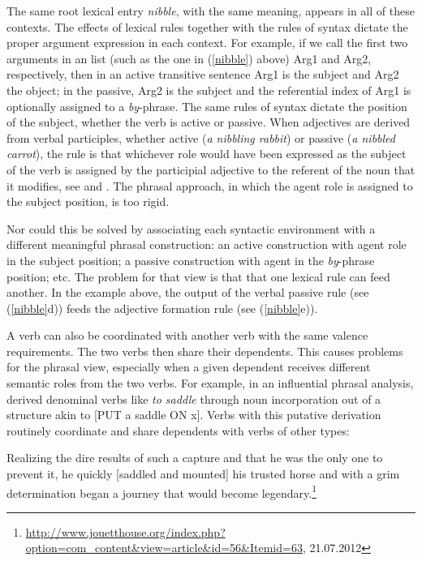 \documentclass[output=paper]{langsci/langscibook}
\begin{document}
The same root lexical entry \emph{nibble}, with the same meaning, appears in all of these contexts.
The effects of lexical rules together with the rules of syntax dictate the proper argument
expression in each context.  For example, if we call the first two arguments in an \argst list
(such as the one in (\ref{nibble}) above) Arg1 and Arg2, respectively, then in an active
transitive sentence Arg1 is the subject and Arg2 the object; in the passive, Arg2 is the subject and
the referential index of Arg1 is optionally assigned to a \emph{by}-phrase.  The same rules of
syntax dictate the position of the subject, whether the verb is active or passive.  When adjectives
are derived from verbal participles, whether active (\emph{a nibbling rabbit}) or passive (\emph{a
  nibbled carrot}), the rule is that whichever role would have been expressed as the subject of the
verb is assigned by the participial adjective to the referent of the noun that it modifies, see \citet{Bresnan:1982passive} 
and \citet[Chapter~3]{BATW2015a}.  
The phrasal approach, in which the agent role is assigned to the subject position, is too rigid.  

Nor could this be solved by associating each syntactic environment with a different meaningful phrasal construction: an active construction with agent role in the subject position; a passive construction with agent in the \textit{by}-phrase position; etc.  The problem for that view is that that one lexical rule can feed another.  In the example above, the output of the verbal passive rule (see (\ref{nibble}d)) feeds the adjective formation rule (see (\ref{nibble}e)).  
 
A verb can also be coordinated with another verb with the same valence requirements.  The two verbs then share their dependents.  This causes problems for the phrasal view, especially when a given dependent receives different semantic roles from the two verbs.  For example, in an influential phrasal analysis, \citet{hale+keyser:1993}
derived denominal verbs like \textit{to saddle} through noun incorporation out of a structure akin to
[PUT a saddle ON x].  Verbs with this putative derivation routinely coordinate and share
dependents with verbs of other types: 

\begin{exe}
\ex Realizing the dire results of such a capture and that he was the only one to prevent it, he quickly
[saddled and mounted] his trusted horse and with a grim determination began a journey that would
become legendary.\footnote{\url{http://www.jouetthouse.org/index.php?option=com_content&view=article&id=56&Itemid=63},
  21.07.2012}  
\end{exe}
\end{document}
